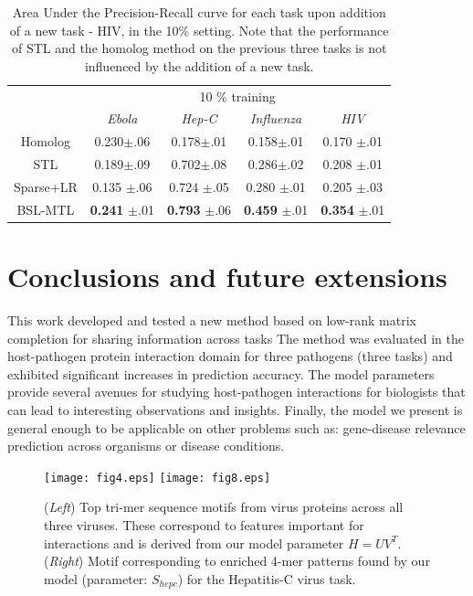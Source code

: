 \documentclass{bioinfo}
\begin{document}
\begin{table}[h]\caption{Area Under the Precision-Recall curve for each task upon addition of a new task - HIV, in the 10\% setting. Note that the performance of STL and the homolog method on the previous three tasks is not influenced by the addition of a new task.}
\label{hivresults}
\begin{small}
\begin{center}
\def\arraystretch{1.2}
\begin{tabular}{c|cccc}
\toprule
& \multicolumn{4}{c}{10 \% training } \\
& \textit{Ebola} & \textit{Hep-C} & \textit{Influenza} & \textit{HIV} \\ \midrule
Homolog & 0.230$\pm$.06 & 0.178$\pm$.01 & 0.158$\pm$.01 & 0.170 $\pm$.01 \\
STL  & 0.189$\pm$.09 & 0.702$\pm$.08 & 0.286$\pm$.02  & 0.208 $\pm$.01 \\ 
Sparse+LR & 0.135 $\pm$.06 & 0.724 $\pm$.05 & 0.280 $\pm$.01 & 0.205 $\pm$.03  \\ 
BSL-MTL & \textbf{0.241} $\pm$.01 & \textbf{0.793} $\pm$.06 & \textbf{0.459} $\pm$.01 & \textbf{0.354} $\pm$.01  \\ \bottomrule
\end{tabular}
\end{center}
\end{small}
\end{table}


\section{Conclusions and future extensions}
This work developed and tested a new method based on low-rank matrix completion for sharing information across tasks
The method was evaluated in the host-pathogen protein interaction domain for three pathogens (three tasks) and exhibited significant increases in prediction accuracy. The model parameters provide several avenues for
studying host-pathogen interactions for biologists that can lead to interesting observations and insights. Finally, the model we present is general enough to be applicable on other problems such as: gene-disease relevance prediction across organisms or disease conditions. 


\begin{figure}
\texttt{[image: fig4.eps]}
\texttt{[image: fig8.eps]}
\caption{(\textit{Left}) Top tri-mer sequence motifs from virus proteins across all three viruses. These correspond to features important for interactions and is derived from our model parameter $H = U V^{T}$. (\textit{Right}) Motif corresponding to enriched 4-mer patterns found by our model (parameter: $S_{hepc}$) for the Hepatitis-C virus task.}%
\label{fig:virus_motifs}
\end{figure}
\end{document}

